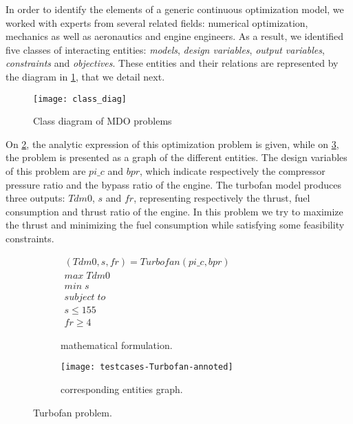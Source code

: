 In order to identify the elements of a generic continuous optimization model, we worked with experts from several related fields: numerical optimization, mechanics as well as aeronautics and engine engineers. As a result, we identified five classes of interacting entities: \emph{models}, \emph{design variables}, \emph{output variables}, \emph{constraints} and \emph{objectives}. These entities and their relations are represented by the diagram in \figurename{} \ref{class_diag}, that we detail next.

\begin{figure}[t]
	\centering
	\texttt{[image: class\_diag]}
	\caption{Class diagram of MDO problems}
	\label{class_diag}
\end{figure}

On \figurename{} \ref{turbofan:math}, the analytic expression of this optimization problem is given, while on \figurename{} \ref{turbofan:graph}, the problem is presented as a graph of the different entities. The design variables of this problem are $pi\_c$ and $bpr$, which indicate respectively the compressor pressure ratio and the bypass ratio of the engine. The turbofan model produces three outputs: $Tdm0$, $s$ and $fr$, representing respectively the thrust, fuel consumption and thrust ratio of the engine. In this problem we try to maximize the thrust and minimizing the fuel consumption while satisfying some feasibility constraints. 

\begin{figure}
\centering
	\begin{subfigure}[b]{0.4\textwidth}
		$\begin{array}{c}
			(Tdm0, s, fr) = Turbofan(pi\_c, bpr) \\
			max \; Tdm0 \\
			min \; s \\
			subject \; to \\
			s \leq 155 \\
			fr \geq 4
		\end{array}$
		\caption{mathematical formulation.}\label{turbofan:math}
	\end{subfigure}
	\hfill%
	\begin{subfigure}[b]{0.55\textwidth}
			\centering
			\texttt{[image: testcases-Turbofan-annoted]}
			\caption{corresponding entities graph.}\label{turbofan:graph}
	\end{subfigure}

\caption{Turbofan problem.}
\label{turbofan}

\end{figure}

